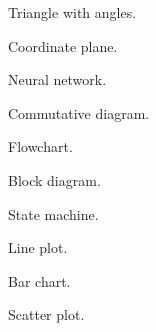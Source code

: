 \documentclass{article}
\begin{document}
\begin{figure}[h]\centering\caption{Triangle with angles.}\end{figure}
\begin{figure}[h]\centering\caption{Coordinate plane.}\end{figure}
\newpage
\begin{figure}[h]\centering\caption{Neural network.}\end{figure}
\begin{figure}[h]\centering\caption{Commutative diagram.}\end{figure}
\newpage
\begin{figure}[h]\centering\caption{Flowchart.}\end{figure}
\newpage
\begin{figure}[h]\centering\caption{Block diagram.}\end{figure}
\begin{figure}[h]\centering\caption{State machine.}\end{figure}
\newpage
\begin{figure}[h]\centering\caption{Line plot.}\end{figure}
\begin{figure}[h]\centering\caption{Bar chart.}\end{figure}
\newpage
\begin{figure}[h]\centering\caption{Scatter plot.}\end{figure}
\end{document}
